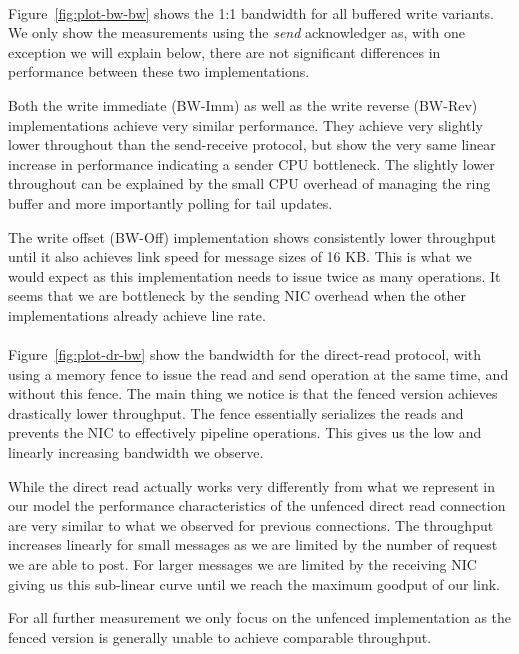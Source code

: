 \paragraph{} Figure~\ref{fig:plot-bw-bw} shows the 1:1 bandwidth for all buffered write variants. We only show the measurements
using the \emph{send} acknowledger as, with one exception we will explain below, there are not significant differences
in performance between these two implementations.

Both the write immediate (BW-Imm) as well
as the write reverse (BW-Rev) implementations achieve very similar performance. They achieve very slightly lower throughout
than the send-receive protocol, but show the very same linear increase in performance indicating a sender CPU bottleneck. The
slightly lower throughout can be explained by the small CPU overhead of managing the ring buffer and more importantly  
polling for tail updates.

The write offset (BW-Off) implementation shows consistently lower throughput until it also achieves
link speed for message sizes of 16 KB. This is what we would expect as this implementation needs to issue 
twice as many operations. It seems that we are bottleneck by the sending NIC overhead when the other
implementations already achieve line rate.

\paragraph{} Figure~\ref{fig:plot-dr-bw} show the bandwidth for the direct-read protocol, with using a memory fence
to issue the read and send operation at the same time, and without this fence.  The main thing we notice is that the 
fenced version achieves drastically lower throughput. The fence essentially serializes the reads and prevents the NIC 
to effectively pipeline operations. This gives us the low and linearly increasing bandwidth we observe.

While the direct read actually works very differently from what we represent in our model the performance 
characteristics of the unfenced direct read connection are very similar to what we observed for previous connections. The
throughput increases linearly for small messages as we are limited by the number of request we are able to post. For larger
messages we are limited by the receiving NIC giving us this sub-linear curve until we reach the maximum goodput of our link.

For all further measurement we only focus on the unfenced implementation as the fenced version is generally unable
to achieve comparable throughput.


